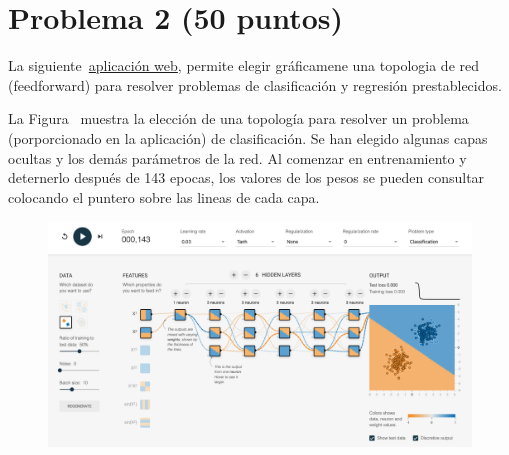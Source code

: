 \documentclass[10pt]{article}
\begin{document}
\section*{Problema 2 (50 puntos)}\label{sec-problema-2-50-puntos}%

\noindent{}La siguiente~\href{http://playground.tensorflow.org/\%23activation=tanh\%26batchSize=10\%26dataset=circle\%26regDataset=reg-plane\%26learningRate=0.03\%26regularizationRate=0\%26noise=0\%26networkShape=4,2\%26seed=0.12132\%26showTestData=false\%26discretize=false\%26percTrainData=50\%26x=true\%26y=true\%26xTimesY=false\%26xSquared=false\%26ySquared=false\%26cosX=false\%26sinX=false\%26cosY=false\%26sinY=false\%26collectStats=false\%26problem=classification\%26initZero=false\%26hideText=false}{aplicación web}, permite elegir gráficamene una topologia de red (feedforward) para resolver problemas de
clasificación y regresión prestablecidos.%

La Figura~ muestra la elección de una topología para resolver un problema (porporcionado en la aplicación) de clasificación. 
Se han elegido algunas capas ocultas y los demás parámetros de la red. 
Al comenzar en entrenamiento y deternerlo después de 143 epocas, los valores de los pesos
se pueden consultar colocando el puntero sobre las lineas de cada capa. %

\begin{figure}[tbp]%
\begin{mdcenter}%

\noindent{} \includegraphics[keepaspectratio=true,width=\dimwidth{1.00}]{images/playground}{}%

\mdhr{}%

\noindent{}%
\end{mdcenter}\label{fig-play}%
\end{figure}%
\end{document}
